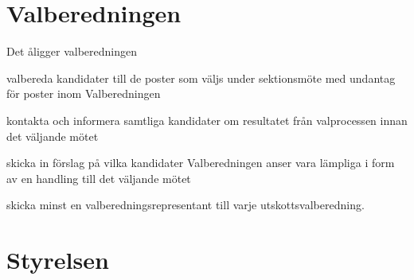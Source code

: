 \documentclass[pdfbookmarks,a4paper,11pt]{article}
\newlength{\itemcollength}
\newenvironment{reglemlista}{%
  \begin{list}{}{%
      \setlength{\labelwidth}{\itemcollength}%
      \setlength{\leftmargin}{\labelwidth + \labelsep}%
      \renewcommand{\makelabel}[1]{%
        \raisebox{0pt}[1ex][0pt]{%
          \makebox[\labelwidth][l]{%
            \parbox[t]{\itemcollength}{%
              \raggedright\hspace{0pt}##1}}}\hfill}%
      }}{%
  \end{list}}
\begin{document}
\section{Valberedningen}

\begin{reglemlista}

	\item[Åligganden]
	Det åligger valberedningen
	\begin{attlista}
		\item valbereda kandidater till de poster som väljs under sektionsmöte med undantag för poster inom Valberedningen
		\item kontakta och informera samtliga kandidater om resultatet från valprocessen innan det
		väljande mötet
		\item skicka in förslag på vilka kandidater Valberedningen anser vara lämpliga i form av en
		handling till det väljande mötet
	\item skicka minst en valberedningsrepresentant till varje utskottsvalberedning.
	\end{attlista}
\end{reglemlista}

\section{Styrelsen}
\end{document}
